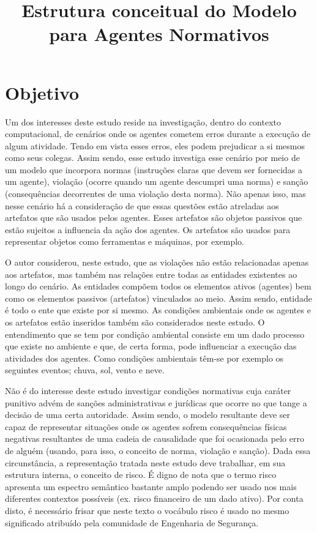 \documentclass[12pt]{article}
\title{Estrutura conceitual do Modelo para Agentes Normativos}
\begin{document}
 

\section{Objetivo}

Um dos interesses deste estudo reside na investigação, dentro do contexto computacional, de cenários onde os agentes cometem erros durante a execução de algum atividade. Tendo em vista esses erros, eles podem prejudicar a si mesmos como seus colegas. Assim sendo, esse estudo investiga esse cenário por meio de um modelo que incorpora normas (instruções claras que devem ser fornecidas a um agente), violação (ocorre quando um agente descumpri uma norma) e sanção (consequências decorrentes de uma violação desta norma). Não apenas isso, mas nesse cenário há a consideração de que essas questões estão atreladas aos artefatos que são usados pelos agentes. Esses artefatos são objetos passivos que estão sujeitos a influencia da ação dos agentes. Os artefatos são usados para representar objetos como ferramentas e máquinas, por exemplo. 

O autor considerou, neste estudo, que as violações não estão relacionadas apenas aos artefatos, mas também nas relações entre todas as entidades existentes ao longo do cenário. As entidades compõem todos os elementos ativos (agentes) bem como os elementos passivos (artefatos) vinculados ao meio. Assim sendo, entidade é todo o ente que existe por si mesmo. As condições ambientais onde os agentes e os artefatos estão inseridos também são considerados neste estudo. O entendimento que se tem por condição ambiental consiste em um dado processo que existe no ambiente e que, de certa forma, pode influenciar a execução das atividades dos agentes. Como condições ambientais têm-se por exemplo os seguintes eventos; chuva, sol, vento e neve. 

Não é do interesse deste estudo investigar condições normativas cuja caráter punitivo advém de sanções administrativas e jurídicas que ocorre no que tange a decisão de uma certa autoridade. Assim sendo, o modelo resultante deve ser capaz de representar situações onde os agentes sofrem consequências físicas negativas resultantes de uma cadeia de causalidade que foi ocasionada pelo erro de alguém (usando, para isso, o conceito de norma, violação e sanção). Dada essa circunstância, a representação tratada neste estudo deve trabalhar, em sua estrutura interna, o conceito de risco. É digno de nota que o termo risco apresenta um espectro semântico bastante amplo podendo ser usado nos mais diferentes contextos possíveis (ex. risco financeiro de um dado ativo). Por conta disto, é necessário frisar que neste texto o vocábulo risco é usado no mesmo significado atribuído pela comunidade de Engenharia de Segurança. 
\end{document}
